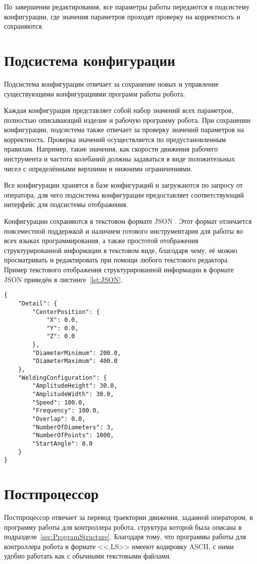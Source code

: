 По завершении редактирования, все параметры работы передаются в подсистему конфигурации, где значения параметров проходят проверку на корректность и сохраняются.


\section{Подсистема конфигурации}
Подсистема конфигурации отвечает за сохранение новых и управление существующими конфигурациями программ работы робота.

Каждая конфигурация представляет собой набор значений всех параметров, полностью описывающий изделие и рабочую программу робота.
При сохранении конфигурации, подсистема также отвечает за проверку значений параметров на корректность.
Проверка значений осуществляется по предустановленным правилам.
Например, такие значения, как скорости движения рабочего инструмента и частота колебаний должны задаваться в виде положительных чисел с определёнными верхними и нижними ограничениями.

Все конфигурации хранятся в базе конфигураций и загружаются по запросу от оператора, для чего подсистема конфигурации предоставляет соответствующий интерфейс для подсистемы отображения.

Конфигурации сохраняются в текстовом формате JSON .
Этот формат отличается повсеместной поддержкой и наличием готового инструментария для работы во всех языках программирования, а также простотой отображения структурированной информации в текстовом виде, благодаря чему, её можно просматривать и редактировать при помощи любого текстового редактора.
Пример текстового отображения структурированной информации в формате JSON приведён в листинге~\ref{lst:JSON}.

\begin{lstlisting}[caption={Текстовое отображение информации в формате JSON}, label={lst:JSON}]
{
	"Detail": {
		"CenterPosition": {
			"X": 0.0,
			"Y": 0.0,
			"Z": 0.0
		},
		"DiameterMinimum": 200.0,
		"DiameterMaximum": 400.0
	},
	"WeldingConfiguration": {
		"AmplitudeHeight": 30.0,
		"AmplitudeWidth": 30.0,
		"Speed": 100.0,
		"Frequency": 100.0,
		"Overlap": 0.0,
		"NumberOfDiameters": 3,
		"NumberOfPoints": 1000,
		"StartAngle": 0.0
	}
}
\end{lstlisting}


\section{Постпроцессор}
Постпроцессор отвечает за перевод траектории движения, заданной оператором, в программу работы для контроллера робота, структура которой была описана в подразделе~\ref{sec:ProgramStructure}.
Благодаря тому, что программы работы для контроллера робота в формате <<.LS>> имееют кодировку ASCII, с ними удобно работать как с обычными текстовыми файлами.

